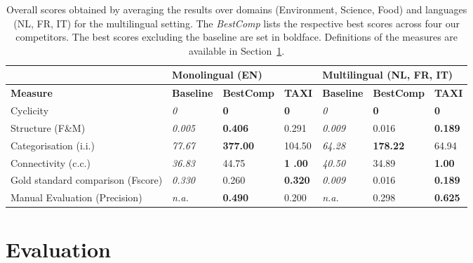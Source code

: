 \documentclass[11pt,letterpaper]{article}
\begin{document}
\begin{table}[h]
\footnotesize
\centering
\begin{tabular}{l|lll|lll}
                                  & \multicolumn{3}{l}{ \bf Monolingual (EN)} & \multicolumn{3}{l}{ \bf Multilingual (NL, FR, IT)} \\ \hline
\textbf{Measure}                           & \textbf{ Baseline}    & \textbf{BestComp}    & \bf TAXI     & \bf Baseline      &  \bf BestComp & \bf TAXI       \\ \hline 
Cyclicity                         & \it 0           & \bf 0           & \bf 0        &\it  0             & \bf 0             & \bf 0          \\
Structure (F\&M)                  & \it 0.005      & \bf 0.406      & 0.291   & \it 0.009    & 0.016    & \bf 0.189     \\
Categorisation (i.i.)             & \it 77.67       & \bf 377.00         & 104.50    &\it  64.28         & \bf 178.22        & 64.94      \\
Connectivity (c.c.)               & \it 36.83       & 44.75       & \bf 1  .00      & \it 40.50          & 34.89         & \bf 1.00          \\
Gold standard comparison (Fscore) & \it 0.330        & 0.260        & \bf 0.320     & \it 0.009        & 0.016        & \bf 0.189     \\
Manual Evaluation (Precision)     & \it n.a.        & \bf 0.490    & 0.200     & \it n.a.          & 0.298        &\bf 0.625    
\end{tabular}

\caption{Overall scores obtained by averaging the results over domains (Environment, Science, Food) and languages (NL, FR, IT) for the multilingual setting. The  \textit{BestComp} lists the respective best scores across  four our competitors. The best scores excluding the baseline are set in boldface. Definitions of the measures are available in Section~\ref{sec:evaluation}. }
\label{tbl:results}
\end{table}



\section{Evaluation}
\label{sec:evaluation}
\end{document}
